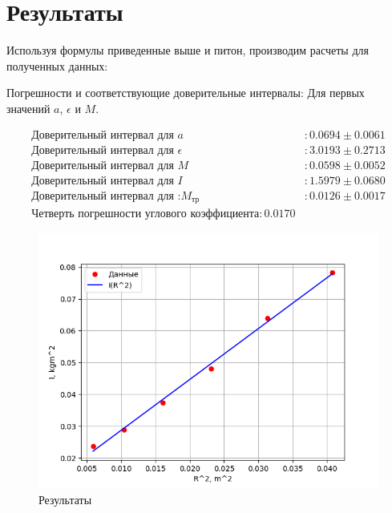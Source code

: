 \documentclass[a4paper]{article}
\begin{document}
\section{Результаты}

Используя формулы приведенные выше и питон, производим расчеты для полученных данных:

Погрешности и соответствующие доверительные интервалы: Для первых значений $a$, $\epsilon$ и $M$.
\begin{center}
\begin{align*}
\text{Доверительный интервал для } a &: 0.0694 \pm 0.0061 \\
\text{Доверительный интервал для } \epsilon &: 3.0193 \pm 0.2713 \\
\text{Доверительный интервал для } M &: 0.0598 \pm 0.0052\\
\text{Доверительный интервал для }I &: 1.5979 \pm 0.0680\\
\text{Доверительный интервал для :}M_{\text{тр}} &: 0.0126 \pm 0.0017\\
\text{Четверть погрешности углового коэффициента}: 0.0170
\end{align*}
\end{center}
\begin{figure}[H]
\begin{center}
	\centering
	\includegraphics[scale=0.5]{I(R^2).png}
	\caption{Результаты}
\end{center}
\end{figure}
\end{document}
